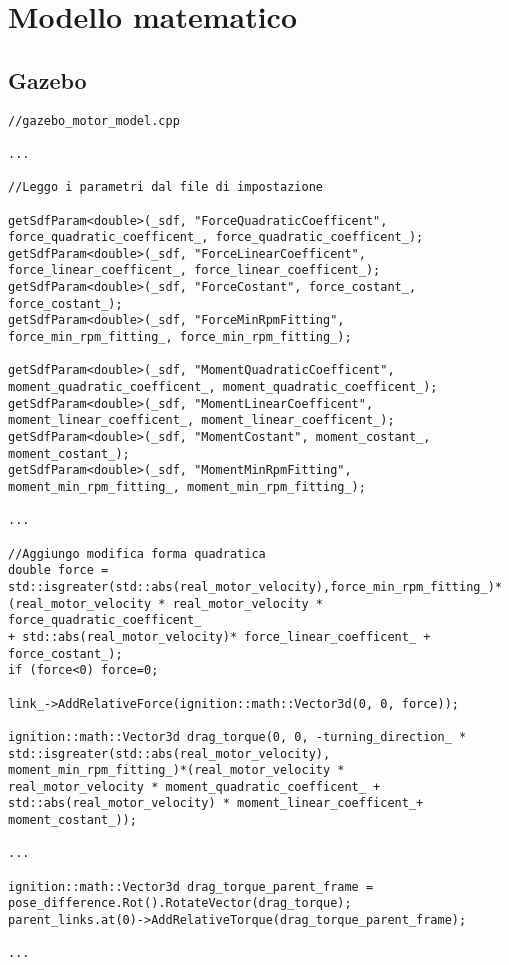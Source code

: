 \section{Modello matematico}

\subsection{Gazebo}

\lstset{language=c++}
\begin{lstlisting}
//gazebo_motor_model.cpp

...

//Leggo i parametri dal file di impostazione

getSdfParam<double>(_sdf, "ForceQuadraticCoefficent", force_quadratic_coefficent_, force_quadratic_coefficent_);
getSdfParam<double>(_sdf, "ForceLinearCoefficent", force_linear_coefficent_, force_linear_coefficent_);
getSdfParam<double>(_sdf, "ForceCostant", force_costant_, force_costant_);
getSdfParam<double>(_sdf, "ForceMinRpmFitting", force_min_rpm_fitting_, force_min_rpm_fitting_);

getSdfParam<double>(_sdf, "MomentQuadraticCoefficent", moment_quadratic_coefficent_, moment_quadratic_coefficent_);
getSdfParam<double>(_sdf, "MomentLinearCoefficent", moment_linear_coefficent_, moment_linear_coefficent_);
getSdfParam<double>(_sdf, "MomentCostant", moment_costant_, moment_costant_);
getSdfParam<double>(_sdf, "MomentMinRpmFitting", moment_min_rpm_fitting_, moment_min_rpm_fitting_);

...

//Aggiungo modifica forma quadratica
double force = std::isgreater(std::abs(real_motor_velocity),force_min_rpm_fitting_)*
(real_motor_velocity * real_motor_velocity * force_quadratic_coefficent_ 
+ std::abs(real_motor_velocity)* force_linear_coefficent_ + force_costant_);
if (force<0) force=0;

link_->AddRelativeForce(ignition::math::Vector3d(0, 0, force));

ignition::math::Vector3d drag_torque(0, 0, -turning_direction_ *
std::isgreater(std::abs(real_motor_velocity),
moment_min_rpm_fitting_)*(real_motor_velocity * 
real_motor_velocity * moment_quadratic_coefficent_ + 
std::abs(real_motor_velocity) * moment_linear_coefficent_+ moment_costant_));

...

ignition::math::Vector3d drag_torque_parent_frame = pose_difference.Rot().RotateVector(drag_torque);
parent_links.at(0)->AddRelativeTorque(drag_torque_parent_frame);

...

\end{lstlisting}

